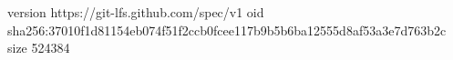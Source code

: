 version https://git-lfs.github.com/spec/v1
oid sha256:37010f1d81154eb074f51f2ccb0fcee117b9b5b6ba12555d8af53a3e7d763b2c
size 524384
